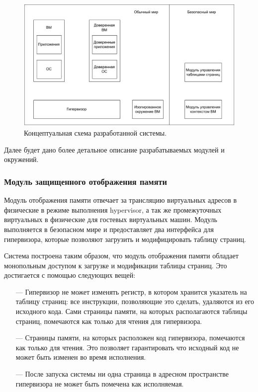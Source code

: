 \begin{figure}[h]
	\centering
	\includegraphics[width=\textwidth]{img/full-design.pdf}
	\caption{Концептуальная схема разработанной системы.}
	\label{fig:full-design}
\end{figure}

Далее будет дано более детальное описание разрабатываемых модулей и окружений.

\subsubsection{Модуль защищенного отображения памяти}

Модуль отображения памяти отвечает за трансляцию виртуальных адресов в физические в режиме выполнения hypervisor, а так же промежуточных виртуальных в физические для гостевых виртуальных машин. Модуль выполняется в безопасном мире и предоставляет два интерфейса для гипервизора, которые позволяют загрузить и модифицировать таблицу страниц.

Система построена таким образом, что модуль отображения памяти обладает монопольным доступом к загрузке и модификации таблицы страниц. Это достигается с помощью следующих вещей:

\begin{itemize}
	\item [---] Гипервизор не может изменять регистр, в котором хранится указатель на таблицу страниц: все инструкции, позволяющие это сделать, удаляются из его исходного кода. Сами страницы памяти, на которых располагаются таблицы страниц, помечаются как только для чтения для гипервизора.

	\item [---] Страницы памяти, на которых расположен код гипервизора, помечаются как только для чтения. Это позволяет гарантировать что исходный код не может быть изменен во время исполнения.

	\item [---] После запуска системы ни одна страница в адресном пространстве гипервизора не может быть помечена как исполняемая.
\end{itemize}

